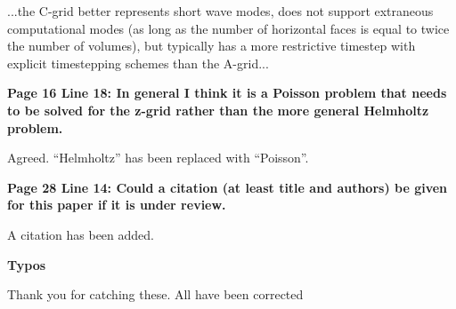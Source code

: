 \documentclass{article}
\begin{document}
{\color{blue}...the C-grid better represents short wave modes, does not support extraneous computational modes (as long as the number of horizontal faces is equal to twice the number of volumes), but typically has a more restrictive timestep with explicit timestepping schemes than the A-grid...}

\textbf{{Page 16 Line 18: In general I think it is a Poisson problem that needs to be solved
for the z-grid rather than the more general Helmholtz problem.}}

Agreed.  ``Helmholtz'' has been replaced with ``Poisson''.

\textbf{{Page 28 Line 14: Could a citation (at least title and authors) be given for this
paper if it is under review.}}

A citation has been added.

\textbf{{Typos}}

Thank you for catching these.  All have been corrected
\end{document}
